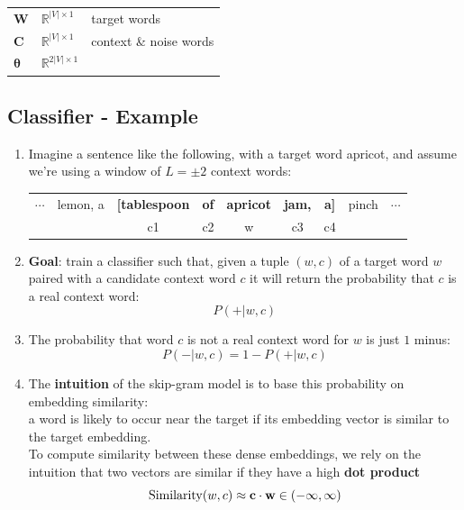 \begin{table}[H]
    \begin{tabular}{l l l}
        $\mathbf{W}$ & $\mathbb{R}^{|V|\times 1}$ & target words \\
        $\mathbf{C}$ & $\mathbb{R}^{|V|\times 1}$ & context \& noise words \\
        $\bm{\theta}$ & $\mathbb{R}^{2|V|\times 1}$ & \\
    \end{tabular}
\end{table}        

\subsection{Classifier - Example \cite{nlp-1}}
\begin{enumerate}
    \item Imagine a sentence like the following, with a target word apricot, and assume we’re using a window of $L = \pm 2$ context words:
    \begin{table}[h]
        \centering
        \begin{tabular}{c c c c c c c c c}
            $\cdots$ & lemon, a & \textbf{[tablespoon} & \textbf{of} & \textbf{apricot} & \textbf{jam,} & \textbf{a]} & pinch & $\cdots$ \\
             &  & c1 & c2 & w & c3 & c4 &  &  \\
        \end{tabular}
    \end{table}

    \item \textbf{Goal}: train a classifier such that, given a tuple $(w, c)$ of a target word $w$ paired with a candidate context word $c$ it will return the probability that $c$ is a real context word: \[ P(+|w, c) \]

    \item The probability that word $c$ is not a real context word for $w$ is just $1$ minus: \[ P(-|w, c) = 1-P(+|w, c) \]

    \item The \textbf{intuition} of the skip-gram model is to base this probability on embedding similarity:\\
    a word is likely to occur near the target if its embedding vector is similar to the target embedding.\\
    To compute similarity between these dense embeddings, we rely on the intuition that two vectors are similar if they have a high \textbf{dot product}
    \[ \rcmdXSimilarity(w,c) \approx \mathbf{c\cdot w} \hfill \in (-\infty,\infty) \]


\end{enumerate}

